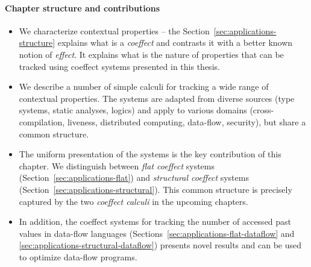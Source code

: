 \paragraph{Chapter structure and contributions}
\begin{itemize}
\item We characterize contextual properties -- the Section~\ref{sec:applications-structure}
  explains what is a \emph{coeffect} and contrasts it with a better known notion of
  \emph{effect}. It explains what is the nature of properties that can be tracked using
  coeffect systems presented in this thesis.

\item We describe a number of simple calculi for tracking a wide range of contextual properties.
  The systems are adapted from diverse sources (type systems, static analyses, logics) and apply to
  various domains (cross-compilation, liveness, distributed computing, data-flow, security), but
  share a common structure.

\item The uniform presentation of the systems is the key contribution of this chapter. We distinguish
  between \emph{flat coeffect} systems (Section~\ref{sec:applications-flat}) and \emph{structural coeffect}
  systems (Section~\ref{sec:applications-structural}). This common structure is precisely
  captured by the two \emph{coeffect calculi} in the upcoming chapters.

\item In addition, the coeffect systems for tracking the number of accessed past values in
  data-flow languages (Sections~\ref{sec:applications-flat-dataflow} and \ref{sec:applications-structural-dataflow})
  presents novel results and can be used to optimize data-flow programs.
\end{itemize}



%
%

